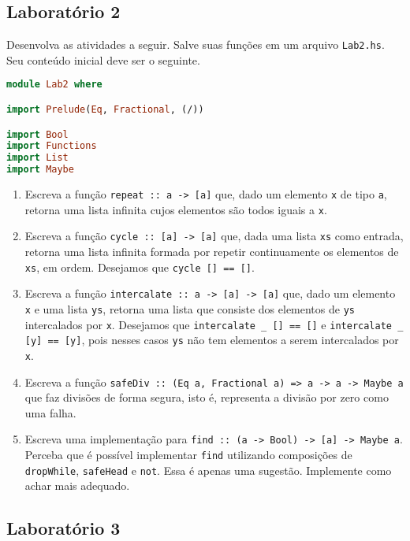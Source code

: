\documentclass[a4paper]{article}
\begin{document}
\subsection{Laboratório 2} \label{lab2}

Desenvolva as atividades a seguir.
Salve suas funções em um arquivo \texttt{Lab2.hs}.
Seu conteúdo inicial deve ser o seguinte.

\begin{lstlisting}[language=haskell, frame=single]
module Lab2 where

import Prelude(Eq, Fractional, (/))

import Bool
import Functions
import List
import Maybe
\end{lstlisting}

\begin{enumerate}
	\item
		Escreva a função \texttt{repeat :: a -> [a]} que, dado um elemento \texttt{x} de tipo \texttt{a}, retorna uma lista infinita cujos elementos são todos iguais a \texttt{x}.
	\item
		Escreva a função \texttt{cycle :: [a] -> [a]} que, dada uma lista \texttt{xs} como entrada, retorna uma lista infinita formada por repetir continuamente os elementos de \texttt{xs}, em ordem.
		Desejamos que \texttt{cycle [] == []}.
	\item
		Escreva a função \texttt{intercalate :: a -> [a] -> [a]} que, dado um elemento \texttt{x} e uma lista \texttt{ys}, retorna uma lista que consiste dos elementos de \texttt{ys} intercalados por \texttt{x}.
		Desejamos que \texttt{intercalate \_ [] == []} e \texttt{intercalate \_ [y] == [y]}, pois nesses casos \texttt{ys} não tem elementos a serem intercalados por \texttt{x}.
	\item
		Escreva a função \texttt{safeDiv :: (Eq a, Fractional a) => a -> a -> Maybe a} que faz divisões de forma segura, isto é, representa a divisão por zero como uma falha.
	\item
		Escreva uma implementação para \texttt{find :: (a -> Bool) -> [a] -> Maybe a}.
		Perceba que é possível implementar \texttt{find} utilizando composições de \texttt{dropWhile}, \texttt{safeHead} e \texttt{not}.
		Essa é apenas uma sugestão. Implemente como achar mais adequado.
\end{enumerate}

\subsection{Laboratório 3}	\label{lab3}
\end{document}
